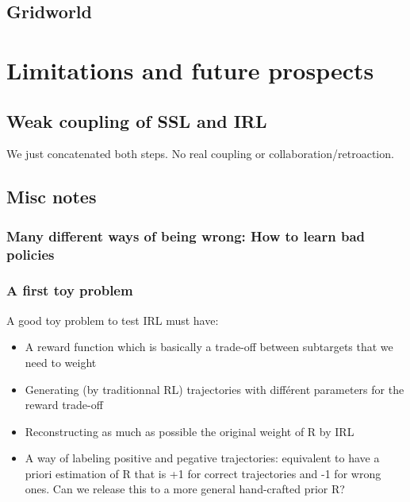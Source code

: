 \documentclass{article}
\begin{document}
\subsection{Gridworld}



\section{Limitations and future prospects \label{sec:limitations}}

\subsection{Weak coupling of SSL and IRL}

We just concatenated both steps. No real coupling or collaboration/retroaction.

\subsection{Misc notes}

\subsubsection{Many different ways of being wrong: How to learn bad policies}

\subsubsection{A first toy problem}

A good toy problem to test IRL must have:

\begin{itemize}
    \item A reward function which is basically a trade-off between subtargets that we need to weight
    \item Generating (by traditionnal RL) trajectories with différent parameters for the reward trade-off
    \item Reconstructing as much as possible the original weight of R by IRL
    \item A way of labeling positive and pegative trajectories: equivalent to have a priori estimation of R that is +1 for correct trajectories and -1 for wrong ones. Can we release this to a more general hand-crafted prior R?
\end{itemize}
\end{document}
